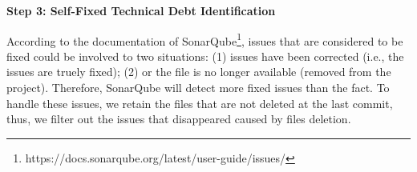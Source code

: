 \documentclass[sigconf,review]{acmart}
\begin{document}
\vspace{0.2cm}
\noindent
\textbf{Step 3: Self-Fixed Technical Debt Identification}

According to the documentation of SonarQube\footnote{https://docs.sonarqube.org/latest/user-guide/issues/}, issues that are considered to be fixed could be involved to two situations: (1) issues have been corrected (i.e., the issues are truely fixed); (2) or the file is no longer available (removed from the project). Therefore, SonarQube will detect more fixed issues than the fact. To handle these issues, we retain the files that are not deleted at the last commit, thus, we filter out the issues that disappeared caused by files deletion.


        
        
    
    
\end{document}
